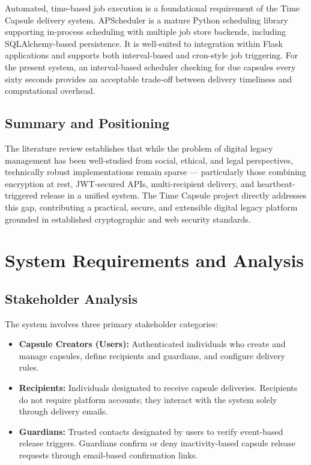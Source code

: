 \documentclass[12pt, a4paper]{article}
\begin{document}
Automated, time-based job execution is a foundational requirement of the Time Capsule delivery system. APScheduler \cite{apscheduler} is a mature Python scheduling library supporting in-process scheduling with multiple job store backends, including SQLAlchemy-based persistence. It is well-suited to integration within Flask applications and supports both interval-based and cron-style job triggering. For the present system, an interval-based scheduler checking for due capsules every sixty seconds provides an acceptable trade-off between delivery timeliness and computational overhead.

\subsection{Summary and Positioning}

The literature review establishes that while the problem of digital legacy management has been well-studied from social, ethical, and legal perspectives, technically robust implementations remain sparse — particularly those combining encryption at rest, JWT-secured APIs, multi-recipient delivery, and heartbeat-triggered release in a unified system. The Time Capsule project directly addresses this gap, contributing a practical, secure, and extensible digital legacy platform grounded in established cryptographic and web security standards.

\section{System Requirements and Analysis}
\label{sec:requirements}

\subsection{Stakeholder Analysis}

The system involves three primary stakeholder categories:

\begin{itemize}
  \item \textbf{Capsule Creators (Users):} Authenticated individuals who create and manage capsules, define recipients and guardians, and configure delivery rules.
  \item \textbf{Recipients:} Individuals designated to receive capsule deliveries. Recipients do not require platform accounts; they interact with the system solely through delivery emails.
  \item \textbf{Guardians:} Trusted contacts designated by users to verify event-based release triggers. Guardians confirm or deny inactivity-based capsule release requests through email-based confirmation links.
\end{itemize}
\end{document}
